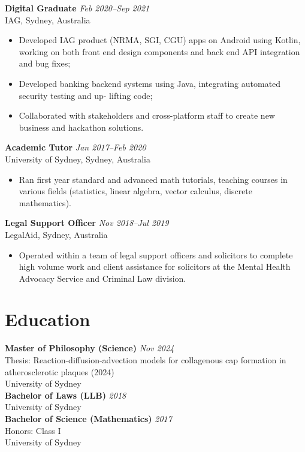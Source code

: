 \documentclass[11pt,letterpaper]{article}
\newcommand{\header}[1]{\textbf{\color{headercolor}#1}}
\begin{document}
\vspace{0.4em}
\header{Digital Graduate} \hfill \hfill \textit {Feb 2020--Sep 2021}\\
IAG, Sydney, Australia
\begin{itemize}[leftmargin=2em,itemsep=0.3ex]
	\item Developed IAG product (NRMA, SGI, CGU) apps on Android using Kotlin, working on both
	front end design components and back end API integration and bug fixes;  
	\item Developed banking backend systems using Java, integrating automated security testing and up-
	lifting code;
	\item Collaborated with stakeholders and cross-platform staff to create new business and hackathon
	solutions.
\end{itemize}
\vspace{0.4em}
\header{Academic Tutor} \hfill \hfill \textit {Jan 2017--Feb 2020}\\
University of Sydney, Sydney, Australia
\begin{itemize}[leftmargin=2em,itemsep=0.3ex]
  \item Ran first year standard and advanced math tutorials, teaching courses in various fields (statistics,
  linear algebra, vector calculus, discrete mathematics).
\end{itemize}
\vspace{0.4em}
\header{Legal Support Officer} \hfill \hfill \textit {Nov 2018--Jul 2019}\\
LegalAid, Sydney, Australia
\begin{itemize}[leftmargin=2em,itemsep=0.3ex]
	\item Operated within a team of legal support officers and solicitors to complete high volume work and
	client assistance for solicitors at the Mental Health Advocacy Service and Criminal Law division.
\end{itemize}

\vspace{0.3em}
\section*{Education}
\header{Master of Philosophy (Science)} \hfill \textit {Nov 2024}\\
Thesis: Reaction-diffusion-advection models for collagenous cap formation in atherosclerotic plaques (2024)\\
University of Sydney\\
\newline
\header{Bachelor of Laws (LLB)} \hfill \hfill \textit {2018}\\
University of Sydney \\
\newline
\header{Bachelor of Science (Mathematics)} \hfill \textit {2017}\\
Honors: Class I\\
University of Sydney
\vspace{0.3em}
\end{document}
